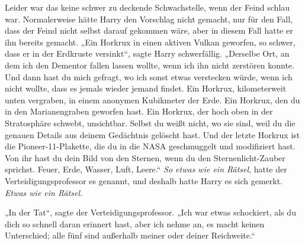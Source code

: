Leider war das keine schwer zu deckende Schwachstelle, wenn der Feind schlau war.
Normalerweise hätte Harry den Vorschlag nicht gemacht, nur für den Fall, dass der Feind nicht selbst darauf gekommen wäre, aber in diesem Fall hatte er ihn bereits gemacht.
„Ein Horkrux in einen aktiven Vulkan geworfen, so schwer, dass er in der Erdkruste versinkt“, sagte Harry schwerfällig. „Derselbe Ort, an dem ich den Dementor fallen lassen wollte, wenn ich ihn nicht zerstören konnte. Und dann hast du mich gefragt, wo ich sonst etwas verstecken würde, wenn ich nicht wollte, dass es jemals wieder jemand findet. Ein Horkrux, kilometerweit unten vergraben, in einem anonymen Kubikmeter der Erde. Ein Horkrux, den du in den Marianengraben geworfen hast. Ein Horkrux, der hoch oben in der Stratosphäre schwebt, unsichtbar. Selbst du weißt nicht, wo sie sind, weil du die genauen Details aus deinem Gedächtnis gelöscht hast. Und der letzte Horkrux ist die Pioneer-11-Plakette, die du in die NASA geschmuggelt und modifiziert hast. Von ihr hast du dein Bild von den Sternen, wenn du den Sternenlicht-Zauber sprichst. Feuer, Erde, Wasser, Luft, Leere.“
\emph{So etwas wie ein Rätsel}, hatte der Verteidigungsprofessor es genannt, und deshalb hatte Harry es sich gemerkt.
\emph{Etwas wie ein Rätsel.}%

„In der Tat“, sagte der Verteidigungsprofessor. „Ich war etwas schockiert, als du dich so schnell daran erinnert hast, aber ich nehme an, es macht keinen Unterschied; alle fünf sind außerhalb meiner oder deiner Reichweite.“

